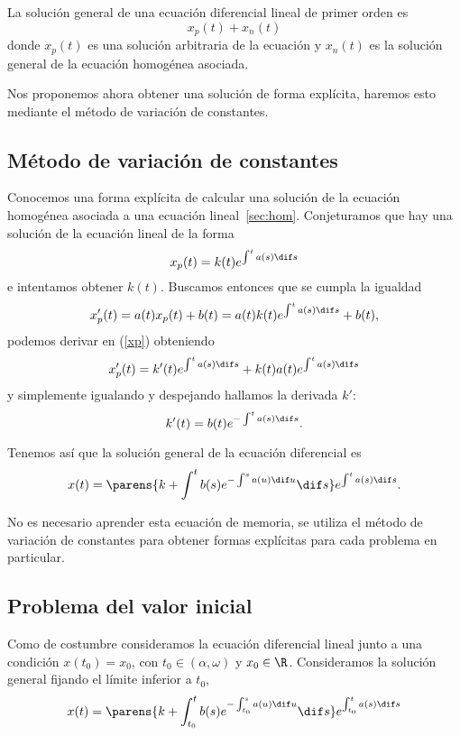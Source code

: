 \documentclass[../main.tex]{subfiles}
\begin{document}
\begin{corollary}
	La solución general de una ecuación diferencial lineal de primer orden es
	\[x_p(t) + x_n(t)\]
	donde \(x_p(t)\) es una solución arbitraria de la ecuación y \(x_n(t)\) es
	la solución general de la ecuación homogénea asociada.
\end{corollary}

Nos proponemos ahora obtener una solución de forma explícita, haremos esto
mediante el método de variación de constantes.

\subsection{Método de variación de constantes}

Conocemos una forma explícita de calcular una solución de la ecuación homogénea
asociada a una ecuación lineal~\autoref{sec:hom}. Conjeturamos que hay una
solución de la ecuación lineal de la forma
\begin{equation}\label{xp}
  x_p(t) = k(t) e^{\int^t a(s) \dif s}
\end{equation}
e intentamos obtener \(k(t)\). Buscamos entonces que se cumpla la igualdad
\[x'_p(t) = a(t)x_p(t) + b(t) = a(t)k(t) e^{\int^t a(s) \dif s} + b(t),\]
podemos derivar en (\ref{xp}) obteniendo
\[x'_p(t) = k'(t) e^{\int^t a(s) \dif s} + k(t)a(t) e^{\int^t a(s) \dif s}\]
y simplemente igualando y despejando hallamos la derivada \(k'\):
\[k'(t) = b(t)e^{-\int^t a(s) \dif s}.\]

Tenemos así que la solución general de la ecuación diferencial es
\[x(t) = \parens{k + \int^t b(s) e^{-\int^s a(u) \dif u} \dif s}
	e^{\int^t a(s) \dif s}.\]

\begin{remark}
	No es necesario aprender esta ecuación de memoria, se utiliza el método de
	variación de constantes para obtener formas explícitas para cada problema en
	particular.
\end{remark}

\subsection{Problema del valor inicial}

Como de costumbre consideramos la ecuación diferencial lineal junto a una
condición \(x(t_0) = x_0\), con \(t_0 \in (\alpha, \omega)\) y \(x_0 \in \R\).
Consideramos la solución general fijando el límite inferior a \(t_0\),
\[x(t) = \parens{k + \int_{t_0}^t b(s) e^{-\int_{t_0}^s a(u) \dif u} \dif s}
	e^{\int_{t_0}^t a(s) \dif s}\]
\end{document}
